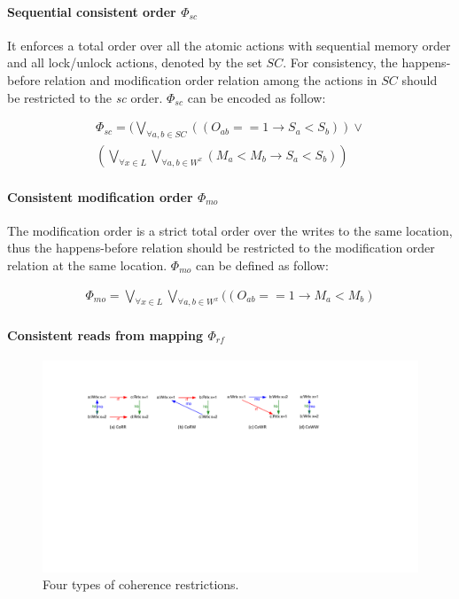 \documentclass[preprint, numbers, 10pt]{sigplanconf}
\begin{document}
\paragraph{Sequential consistent order $\Phi_{sc}$}

It enforces a total order over all the atomic actions with sequential memory order and 
all lock/unlock actions, denoted by the set $SC$. 
For consistency, the happens-before relation and modification order relation among the actions
in $SC$ should be restricted to the \textit{sc} order. 
$\Phi_{sc}$ can be encoded as follow: 

\begin{equation}
\begin{aligned}
\Phi_{sc} = (\bigvee_{\forall a,b\in SC} ((O_{ab}==1\rightarrow S_a<S_b)) \vee \\
                  (\bigvee_{\forall x\in L}\bigvee_{\forall a,b\in W^x} (M_a<M_b\rightarrow S_a<S_b))
\end{aligned}
\end{equation} 

\paragraph{Consistent modification order $\Phi_{mo}$}

The modification order is a strict total order over the writes to the same location, thus 
the happens-before relation should be restricted to the modification order relation 
at the same location. $\Phi_{mo}$ can be defined as follow: 

\begin{equation}
\begin{aligned}
\Phi_{mo} = \bigvee_{\forall x\in L }\bigvee_{\forall a,b\in W^x} ((O_{ab}==1\rightarrow M_a<M_b) 
\end{aligned}
\end{equation} 


\paragraph{Consistent reads from mapping $\Phi_{rf}$}

\begin{figure}%
\centering\includegraphics[scale=0.65]{CO.pdf} %
\caption{Four types of coherence restrictions.}
\label{fig:CO}
\end{figure}
\end{document}
